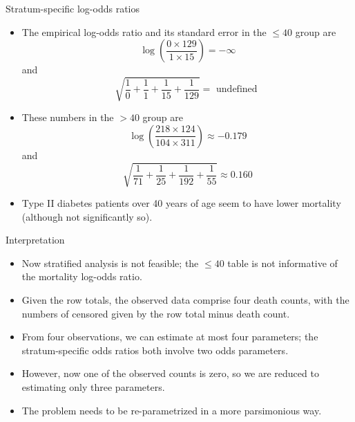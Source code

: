 \documentclass[10pt,handout]{beamer}\usepackage[]{graphicx}\usepackage[]{color}
\begin{document}
\begin{frame}{Stratum-specific log-odds ratios}
	\begin{itemize}
		\item The empirical log-odds ratio and its standard error in the $\leq 40$ group are
		$$
		\log \left(\frac{0 \times 129}{1 \times 15}\right)=-\infty
		$$
		and
		$$
		\sqrt{\frac{1}{0}+\frac{1}{1}+\frac{1}{15}+\frac{1}{129}}=\text { undefined }
		$$
		\item  These numbers in the $>40$ group are
		$$
		\log \left(\frac{218 \times 124}{104 \times 311}\right) \approx-0.179
		$$
		and
		$$
		\sqrt{\frac{1}{71}+\frac{1}{25}+\frac{1}{192}+\frac{1}{55}} \approx 0.160
		$$
		\item Type II diabetes patients over 40 years of age seem to have lower mortality (although not significantly so).
	\end{itemize}
\end{frame}



\begin{frame}{Interpretation}
	\begin{itemize}
		\item Now stratified analysis is not feasible; the $\leq 40$ table is not informative of the mortality log-odds ratio.
		\item Given the row totals, the observed data comprise four death counts, with the numbers of censored given by the row total minus death count.
		\item From four observations, we can estimate at most four
		parameters; the stratum-specific odds ratios both involve two odds parameters.
		\item However, now one of the observed counts is zero, so we are reduced to estimating only three parameters.
		\item The problem needs to be re-parametrized in a more parsimonious way.
	\end{itemize}
\end{frame}
\end{document}

